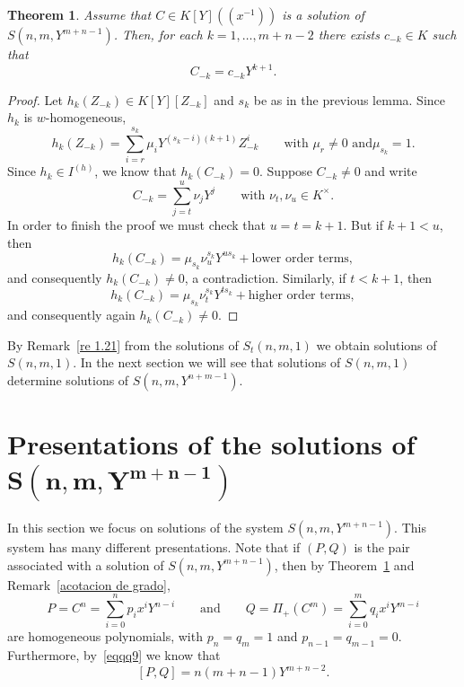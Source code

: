 \documentclass[reqno,a4paper]{amsart}
\newtheorem{theorem}{Theorem}[section]
\theoremstyle{definition}
\theoremstyle{remark}
\begin{document}
\begin{theorem}\label{homogeneo} Assume that $C\in K[Y]((x^{-1}))$ is a solution of $S(n,m,Y^{m+n-1})$.
Then, for each $k=1,\dots,m+n-2$ there exists $c_{-k}\in K$ such that
$$
C_{-k}=c_{-k} Y^{k+1}.
$$
\end{theorem}

\begin{proof} Let $h_k(Z_{-k})\in K[Y][Z_{-k}]$ and $s_k$ be as in the previous lemma. Since $h_k$ is
$w$-homogeneous,
$$
h_k(Z_{-k}) = \sum_{i=r}^{s_k} \mu_i Y^{(s_k-i)(k+1)} Z_{-k}^i \qquad\text{with $\mu_r\ne 0$ and
$\mu_{s_k}=1$.}
$$
Since $h_k\in I^{(h)}$, we know that $h_k(C_{-k})=0$. Suppose $C_{-k}\ne 0$ and write
$$
C_{-k} = \sum_{j=t}^u \nu_j Y^j\qquad \text{with $\nu_t,\nu_u\in K^{\times}$}.
$$
In order to finish the proof we must check that $u = t= k+1$. But if $k+1<u$, then
$$
h_k(C_{-k})=\mu_{s_k} \nu_u^{s_k} Y^{u s_k}+\text{lower order terms},
$$
and consequently $h_k(C_{-k})\ne 0$, a contradiction. Similarly, if $t<k+1$, then
$$
h_k(C_{-k})= \mu_{s_k} \nu_t^{s_k} Y^{t s_k}+\text{higher order terms},
$$
and consequently again $h_k(C_{-k})\ne 0$.
\end{proof}

By Remark~\ref{re 1.21} from the solutions of $S_t(n,m,1)$ we obtain solutions of $S(n,m,1)$. In the next section
we will see that solutions of $S(n,m,1)$ determine solutions of $S(n,m,Y^{n+m-1})$.

\section[Presentations of the solutions of $S(n,m,Y^{m+n-1})$]{Presentations of the solutions of
$\bm{S(n,m,Y^{m+n-1})}$}

In this section we focus on solutions of the system $S(n,m,Y^{m+n-1})$. This system has many different
presentations. Note that if $(P,Q)$ is the pair associated with a solution of $S(n,m,Y^{m+n-1})$, then by
Theorem~\ref{homogeneo}  and Remark~\ref{acotacion de grado},
$$
P=C^n=\sum_{i=0}^n p_i x^i Y^{n-i}\qquad\text{and}\qquad Q=\Pi_{+}(C^m)=\sum_{i=0}^m q_i x^i Y^{m-i}
$$
are homogeneous polynomials, with $p_n = q_m =1$ and $p_{n-1} = q_{m-1} = 0$. Furthermore,
by~\eqref{eqqq9} we know that
$$
[P,Q] = n(m+n-1)Y^{m+n-2}.
$$
\end{document}
